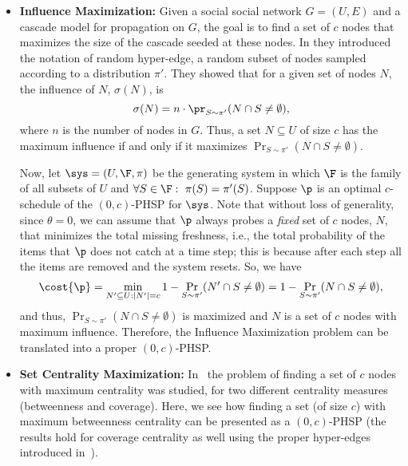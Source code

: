 \begin{itemize}
 \item {\bf Influence Maximization:} Given a social social network $G=(U,E)$ and a cascade model for propagation on $G$, the goal is to find a set of $c$ nodes that maximizes the size of the cascade seeded at these nodes. In \cite{borgs2014maximizing} they introduced the notation of random hyper-edge, a random subset of nodes sampled according to a distribution $\pi'$. They showed that for a given set of nodes $N$, the influence of $N$, $\sigma(N)$, is
 \begin{equation}\label{eq:infmax}
\sigma(N) = n\cdot \pr_{S\sim \pi'} (N \cap S \neq \emptyset),
 \end{equation}
 where $n$ is the number of nodes in $G$. Thus, a set $N\subseteq U$ of size $c$ has the maximum influence if and only if it maximizes $\Pr_{S\sim \pi'}(N\cap S\neq \emptyset)$. 
 
 Now, let $\sys=(U,\F,\pi)$ be the generating system in which $\F$ is the family of all subsets of $U$ and $\forall S\in \F: \ \pi(S) = \pi'(S)$. Suppose $\p$ is an optimal $c$-schedule of the $(0,c)$-PHSP for $\sys$. Note that without loss of generality, since $\theta=0$, we can assume that $\p$ always  probes a \emph{fixed} set of $c$ nodes, $N$, that minimizes the total missing freshness, i.e., the total probability of the items that $\p$ does not catch at a time step; this is because after each step all the items are removed and the system resets. So, we have
 $$\cost{\p} = \min_{N'\subseteq U: |N'|=c} 1 - \Pr_{S\sim \pi'}(N'\cap S\neq \emptyset) = 1 - \Pr_{S\sim \pi'}(N\cap S\neq \emptyset),$$
 and thus, $\Pr_{S\sim \pi'}(N\cap S\neq \emptyset)$ is maximized and $N$ is a set of $c$ nodes with maximum influence. 
 Therefore, the Influence Maximization problem can be translated into a proper $(0,c)$-PHSP.
 
 
 \item {\bf Set Centrality Maximization\cite{yoshida2014almost}:} 
 In~\cite{yoshida2014almost} the problem of finding a set of $c$ nodes with maximum centrality was studied, for two different centrality measures (betweenness and coverage). Here, we see how finding a set (of size $c$) with maximum betweenness centrality can be presented as a $(0,c)$-PHSP (the results hold for coverage centrality as well using the proper hyper-edges introduced in~\cite{yoshida2014almost}).
 

\end{itemize}
